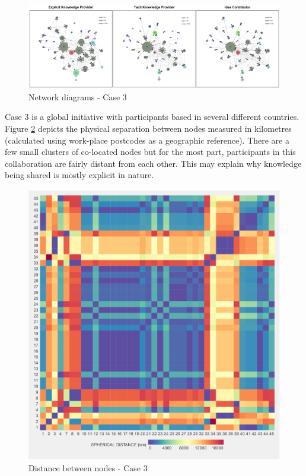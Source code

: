 \begin{landscape}
\begin{figure}
	\centering
	\includegraphics[width=1.0\linewidth]{Images/thesis_networks_case3}
	\caption{Network diagrams - Case 3}
	\label{fig:thesisnetworkscase3}
\end{figure}
\end{landscape}

Case 3 is a global initiative with participants based in several different countries. Figure \ref{fig:sphdistancecase3} depicts the physical separation between nodes measured in kilometres (calculated using work-place postcodes as a geographic reference). There are a few small clusters of co-located nodes but for the most part, participants in this collaboration are fairly distant from each other. This may explain why knowledge being shared is mostly explicit in nature.  \medskip  

\begin{figure}
	\centering
	\includegraphics[width=0.7\linewidth]{Images/sph_distance_case3}
	\caption{Distance between nodes - Case 3}
	\label{fig:sphdistancecase3}
	\end{figure}


